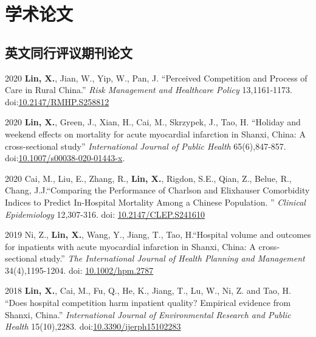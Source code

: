 \documentclass[12pt,letterpaper]{report}
\begin{document}
    \section*{学术论文}

    \subsection*{英文同行评议期刊论文}

    \begin{tablist}
		 \item[2020] \tab \textbf{Lin, X.}, Jian, W., Yip, W., Pan, J. \enquote{Perceived Competition and Process of Care in Rural China.} \textit{Risk Management and Healthcare Policy} 13,1161-1173. doi:\href{https://doi.org/10.2147/RMHP.S258812}{10.2147/RMHP.S258812}
   
         \item[2020] \tab \textbf{Lin, X.}, Green, J., Xian, H., Cai, M., Skrzypek, J., Tao, H. \enquote{Holiday and weekend effects on mortality for acute myocardial infarction in Shanxi, China:  A cross-sectional study} \textit{International Journal of Public Health} 65(6),847-857. doi:\href{https://doi.org/10.1007/s00038-020-01443-x}{10.1007/s00038-020-01443-x}.

    	\item[2020] \tab Cai, M., Liu, E., Zhang, R., \textbf{Lin, X.},  Rigdon, S.E., Qian, Z., Belue, R., Chang, J.J.\enquote{Comparing the Performance of Charlson and Elixhauser Comorbidity Indices to Predict In-Hospital Mortality Among a Chinese Population. } \textit{Clinical Epidemiology} 12,307-316. doi: \href{https://doi.org/10.2147/CLEP.S241610}{10.2147/CLEP.S241610}
    	
    	\item[2019] \tab Ni, Z.,  \textbf{Lin, X.}, Wang, Y., Jiang, T., Tao, H.\enquote{Hospital volume and outcomes for inpatients with acute myocardial infarction in Shanxi, China: A cross‐sectional study.} \textit{The International Journal of Health Planning and Management} 34(4),1195-1204. doi: \href{https://doi.org/10.1002/hpm.2787}{10.1002/hpm.2787}
    	
    	\item[2018] \tab \textbf{Lin, X.}, Cai, M., Fu, Q., He, K., Jiang, T., Lu, W., Ni, Z. and Tao, H. \enquote{Does hospital competition harm inpatient quality? Empirical evidence from Shanxi, China.} \textit{International Journal of Environmental Research and Public Health} 15(10),2283. doi:\href{https://doi.org/10.3390/ijerph15102283}{10.3390/ijerph15102283}
    	

\end{tablist}
\end{document}
